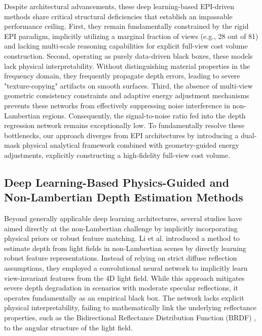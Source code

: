 \documentclass[lettersize,journal]{IEEEtran}
\begin{document}
Despite architectural advancements, these deep learning-based EPI-driven methods share critical structural deficiencies that establish an impassable performance ceiling. First, they remain fundamentally constrained by the rigid EPI paradigm, implicitly utilizing a marginal fraction of views (e.g., 28 out of 81) and lacking multi-scale reasoning capabilities for explicit full-view cost volume construction. Second, operating as purely data-driven black boxes, these models lack physical interpretability. Without distinguishing material properties in the frequency domain, they frequently propagate depth errors, leading to severe "texture-copying" artifacts on smooth surfaces. Third, the absence of multi-view geometric consistency constraints and adaptive energy adjustment mechanisms prevents these networks from effectively suppressing noise interference in non-Lambertian regions. Consequently, the signal-to-noise ratio fed into the depth regression network remains exceptionally low. To fundamentally resolve these bottlenecks, our approach diverges from EPI architectures by introducing a dual-mask physical analytical framework combined with geometry-guided energy adjustments, explicitly constructing a high-fidelity full-view cost volume.

\subsection{Deep Learning-Based Physics-Guided and Non-Lambertian Depth Estimation Methods}

Beyond generally applicable deep learning architectures, several studies have aimed directly at the non-Lambertian challenge by implicitly incorporating physical priors or robust feature matching. Li et al. \cite{li2021} introduced a method to estimate depth from light fields in non-Lambertian scenes by directly learning robust feature representations. Instead of relying on strict diffuse reflection assumptions, they employed a convolutional neural network to implicitly learn view-invariant features from the 4D light field. While this approach mitigates severe depth degradation in scenarios with moderate specular reflections, it operates fundamentally as an empirical black box. The network lacks explicit physical interpretability, failing to mathematically link the underlying reflectance properties, such as the Bidirectional Reflectance Distribution Function (BRDF) \cite{blinn1977}, to the angular structure of the light field.
\end{document}
